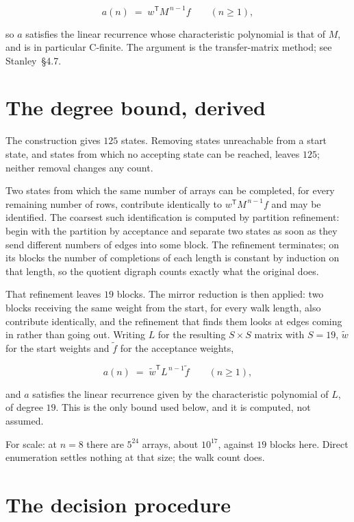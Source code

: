 \documentclass[11pt]{article}
\theoremstyle{definition}
\begin{document}
\[a(n) \;=\; w^{\mathsf T} M^{\,n-1} f \qquad (n \ge 1),\]

so $a$ satisfies the linear recurrence whose characteristic polynomial is that of $M$, and is in particular C-finite. The argument is the transfer-matrix method; see Stanley~\S4.7.

\section{The degree bound, derived}

The construction gives $125$ states. Removing states unreachable from a start state, and states from which no accepting state can be reached, leaves $125$; neither removal changes any count.

Two states from which the same number of arrays can be completed, for every remaining number of rows, contribute identically to $w^{\mathsf T}M^{\,n-1}f$ and may be identified. The coarsest such identification is computed by partition refinement: begin with the partition by acceptance and separate two states as soon as they send different numbers of edges into some block. The refinement terminates; on its blocks the number of completions of each length is constant by induction on that length, so the quotient digraph counts exactly what the original does.

That refinement leaves $19$ blocks. The mirror reduction is then applied: two blocks receiving the same weight from the start, for every walk length, also contribute identically, and the refinement that finds them looks at edges coming in rather than going out. Writing $L$ for the resulting $S \times S$ matrix with $S = 19$, $\tilde w$ for the start weights and $\tilde f$ for the acceptance weights,

\[a(n) \;=\; \tilde w^{\mathsf T} L^{\,n-1} \tilde f \qquad (n \ge 1),\]

and $a$ satisfies the linear recurrence given by the characteristic polynomial of $L$, of degree $19$. This is the only bound used below, and it is computed, not assumed.

For scale: at $n = 8$ there are $5^{24}$ arrays, about $10^{17}$, against $19$ blocks here. Direct enumeration settles nothing at that size; the walk count does.

\section{The decision procedure}
\end{document}
